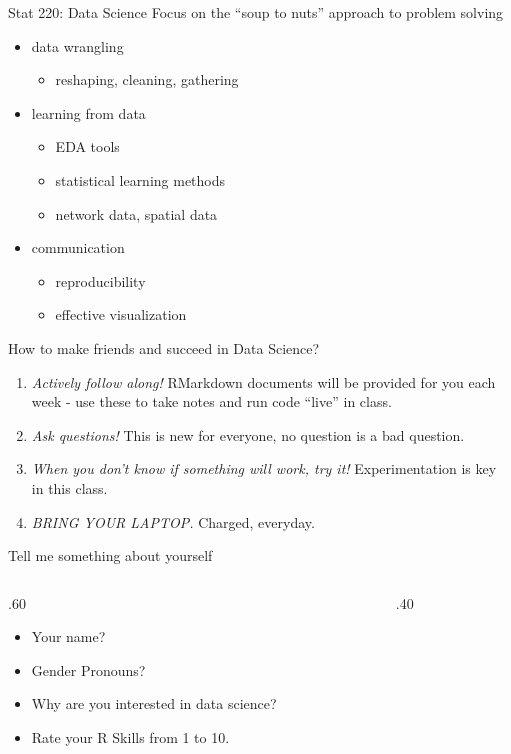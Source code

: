 \documentclass[
  10pt,
  ignorenonframetext,
]{beamer}
\providecommand{\tightlist}{%
  \setlength{\itemsep}{0pt}\setlength{\parskip}{0pt}}
\def\begincols{\begin{columns}}
\def\begincol{\begin{column}}
\def\endcol{\end{column}}
\def\endcols{\end{columns}}
\begin{document}
\begin{frame}{Stat 220: Data Science}
\protect\hypertarget{stat-220-data-science}{}
Focus on the ``soup to nuts'' approach to problem solving

\begin{itemize}
\tightlist
\item
  data wrangling

  \begin{itemize}
  \tightlist
  \item
    reshaping, cleaning, gathering
  \end{itemize}
\item
  learning from data

  \begin{itemize}
  \tightlist
  \item
    EDA tools
  \item
    statistical learning methods
  \item
    network data, spatial data
  \end{itemize}
\item
  communication

  \begin{itemize}
  \tightlist
  \item
    reproducibility
  \item
    effective visualization
  \end{itemize}
\end{itemize}
\end{frame}

\begin{frame}{How to make friends and succeed in Data Science?}
\protect\hypertarget{how-to-make-friends-and-succeed-in-data-science}{}
\begin{enumerate}
\tightlist
\item
  \emph{Actively follow along!} RMarkdown documents will be provided for
  you each week - use these to take notes and run code ``live'' in
  class.
\item
  \emph{Ask questions!} This is new for everyone, no question is a bad
  question.
\item
  \emph{When you don't know if something will work, try it!}
  Experimentation is key in this class.
\item
  \emph{BRING YOUR LAPTOP.} Charged, everyday.
\end{enumerate}
\end{frame}

\begin{frame}{Tell me something about yourself}
\protect\hypertarget{tell-me-something-about-yourself}{}
\begincols
  \begincol{.60\textwidth}
\begin{itemize}
\item Your name?
\item Gender Pronouns?
\item Why are you interested in data science?
\item Rate your R Skills from 1 to 10.
\end{itemize}
\endcol
\begincol{.40\textwidth}

\endcol \endcols
\end{frame}
\end{document}
